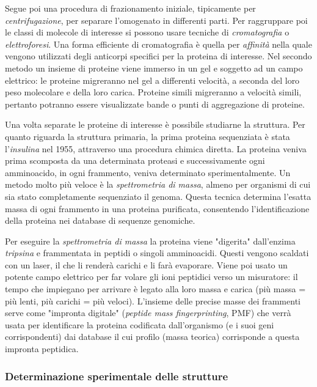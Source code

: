 {Segue poi una procedura di frazionamento iniziale, tipicamente per \textit{centrifugazione}, per separare l'omogenato in differenti parti. Per raggruppare poi le classi di molecole di interesse si possono usare tecniche di \textit{cromatografia} o \textit{elettroforesi}. Una forma efficiente di cromatografia è quella per \textit{affinità} nella quale vengono utilizzati degli anticorpi specifici per la proteina di interesse. Nel secondo metodo un insieme di proteine viene immerso in un gel e soggetto ad un campo elettrico: le proteine migreranno nel gel a differenti velocità, a seconda del loro peso molecolare e della loro carica. Proteine simili migreranno a velocità simili, pertanto potranno essere visualizzate bande o punti di aggregazione di proteine. \\

\par Una volta separate le proteine di interesse è possibile studiarne la struttura. Per quanto riguarda la struttura primaria, la prima proteina sequenziata è stata l'\textit{insulina} nel 1955, attraverso una procedura chimica diretta. La proteina veniva prima scomposta da una determinata proteasi e successivamente ogni amminoacido, in ogni frammento, veniva determinato sperimentalmente. Un metodo molto più veloce è la \textit{spettrometria di massa}, almeno per organismi di cui sia stato completamente sequenziato il genoma. Questa tecnica determina l'esatta massa di ogni frammento in una proteina purificata, consentendo l'identificazione della proteina nei database di sequenze genomiche.

\par Per eseguire la \textit{spettrometria di massa} la proteina viene "digerita" dall'enzima \textit{tripsina} e frammentata in peptidi o singoli amminoacidi. Questi vengono scaldati con un laser, il che li renderà carichi e li farà evaporare. Viene poi usato un potente campo elettrico per far volare gli ioni peptidici verso un misuratore: il tempo che impiegano per arrivare è legato alla loro massa e carica (più massa = più lenti, più carichi = più veloci). L'insieme delle precise masse dei frammenti serve come "impronta digitale" (\textit{peptide mass fingerprinting}, PMF) che verrà usata per identificare la proteina codificata dall'organismo (e i suoi geni corrispondenti) dai database il cui profilo (massa teorica) corrisponde a questa impronta peptidica.

\subsubsection{Determinazione sperimentale delle strutture}

}
